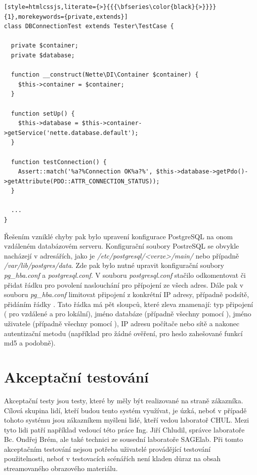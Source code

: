 \documentclass[thesis=M,czech]{FITthesis}[2012/06/26]
\begin{document}
\begin{lstlisting}[style=htmlcssjs,literate={>}{{{\bfseries\color{black}{>}}}}{1},morekeywords={private,extends}]
class DBConnectionTest extends Tester\TestCase {

  private $container;
  private $database;

  function __construct(Nette\DI\Container $container) {
    $this->container = $container;
  }
  
  function setUp() {
    $this->database = $this->container->getService('nette.database.default');
  }

  function testConnection() {
    Assert::match('%a?%Connection OK%a?%', $this->database->getPdo()->getAttribute(PDO::ATTR_CONNECTION_STATUS));
  }
  
  ...
}
\end{lstlisting}

	Řešením vzniklé chyby pak bylo upravení konfigurace PostgreSQL na onom vzdáleném databázovém serveru. Konfigurační soubory PostreSQL se  obvykle nacházejí v adresářích, jako je \textit{/etc/postgresql/<verze>/main/} nebo případně \textit{/var/lib/postgres/data}. Zde pak bylo nutné upravit konfigurační soubory \textit{pg\_hba.conf} a \textit{postgresql.conf}. V souboru \textit{postgresql.conf} stačilo odkomentovat či přidat řádku  pro povolení naslouchání pro přípojení ze všech adres. Dále pak v souboru \textit{pg\_hba.conf} limitovat připojení z konkrétní IP adresy, případně podsítě, přidáním řádky . Tato řádka má pět sloupců, které zleva znamenají: typ připojení ( pro vzdálené a  pro lokální), jméno databáze (případně všechny pomocí ), jméno uživatele (případně všechny pomocí ), IP adresu počítače nebo sítě a nakonec autentizační metodu (například  pro žádné ověření,  pro heslo zahešované funkcí md5 a podobně).

\section{Akceptační testování} \label{sec:testovani_akceptacni}
Akceptační testy jsou testy, které by měly být realizované na straně zákazníka. Cílová skupina lidí, kteří budou tento systém využívat, je úzká, neboť v případě tohoto systému jsou zákazníkem myšleni lidé, kteří vedou laboratoř CHUL. Mezi tyto lidi patří například vedoucí této práce Ing. Jiří Chludil, správce laboratoře Bc. Ondřej Brém, ale také technici ze sousední laboratoře SAGElab. Při tomto akceptačním testování nejsou potřeba uživatelé provádějící testování použitelnosti, neboť v testovacích scénářích není kladen důraz na obsah streamovaného obrazového materiálu. 
\end{document}
